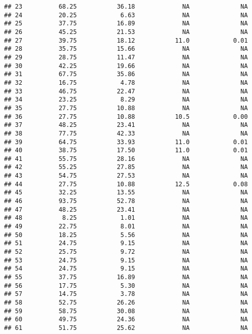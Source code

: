 \documentclass[]{article}
\begin{document}
\begin{verbatim}
## 23          68.25           36.18             NA              NA
## 24          20.25            6.63             NA              NA
## 25          37.75           16.89             NA              NA
## 26          45.25           21.53             NA              NA
## 27          39.75           18.12           11.0            0.01
## 28          35.75           15.66             NA              NA
## 29          28.75           11.47             NA              NA
## 30          42.25           19.66             NA              NA
## 31          67.75           35.86             NA              NA
## 32          16.75            4.78             NA              NA
## 33          46.75           22.47             NA              NA
## 34          23.25            8.29             NA              NA
## 35          27.75           10.88             NA              NA
## 36          27.75           10.88           10.5            0.00
## 37          48.25           23.41             NA              NA
## 38          77.75           42.33             NA              NA
## 39          64.75           33.93           11.0            0.01
## 40          38.75           17.50           11.0            0.01
## 41          55.75           28.16             NA              NA
## 42          55.25           27.85             NA              NA
## 43          54.75           27.53             NA              NA
## 44          27.75           10.88           12.5            0.08
## 45          32.25           13.55             NA              NA
## 46          93.75           52.78             NA              NA
## 47          48.25           23.41             NA              NA
## 48           8.25            1.01             NA              NA
## 49          22.75            8.01             NA              NA
## 50          18.25            5.56             NA              NA
## 51          24.75            9.15             NA              NA
## 52          25.75            9.72             NA              NA
## 53          24.75            9.15             NA              NA
## 54          24.75            9.15             NA              NA
## 55          37.75           16.89             NA              NA
## 56          17.75            5.30             NA              NA
## 57          14.75            3.78             NA              NA
## 58          52.75           26.26             NA              NA
## 59          58.75           30.08             NA              NA
## 60          49.75           24.36             NA              NA
## 61          51.75           25.62             NA              NA

\end{verbatim}
\end{document}
